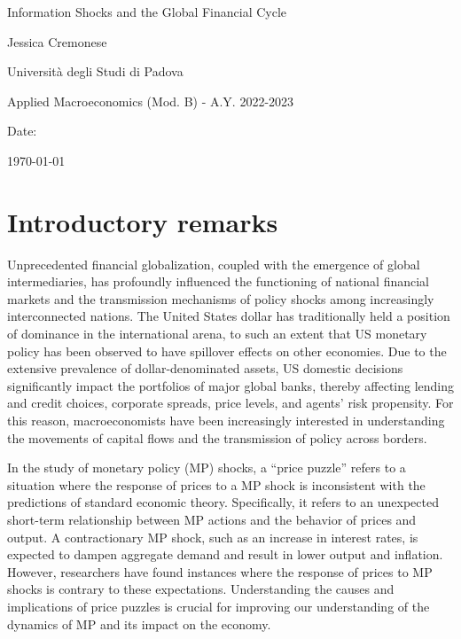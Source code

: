 \documentclass[11pt,a4paper]{article}
\begin{document}
\begin{titlepage}
    \centering
    \vspace*{2cm}
    {\LARGE Information Shocks and the Global Financial Cycle \par}
    \vspace{2cm}
    {\large Jessica Cremonese \par}
    \vspace{1cm}
    {\large Università degli Studi di Padova \par}
    \vspace{1cm}
    {\large Applied Macroeconomics (Mod. B) - A.Y. 2022-2023 \par}
    \vspace{1cm}
    {\large Date: \par}
    {\large \today \par}
\end{titlepage}


\newpage
\section{Introductory remarks}    
Unprecedented financial globalization, coupled with the emergence of global intermediaries, has profoundly influenced the functioning of national financial markets and the transmission mechanisms of policy shocks among increasingly interconnected nations.
The United States dollar has traditionally held a position of dominance in the international arena, to such an extent that US monetary policy has been observed to have spillover effects on other economies.
Due to the extensive prevalence of dollar-denominated assets, US domestic decisions significantly impact the portfolios of major global banks, thereby affecting lending and credit choices, corporate spreads, price levels, and agents' risk propensity.
For this reason, macroeconomists have been increasingly interested in understanding the movements of capital flows and the transmission of policy across borders. 

In the study of monetary policy (MP) shocks, a \enquote{price puzzle} refers to a situation where the response of prices to a MP shock is inconsistent with the predictions of standard economic theory. Specifically, it refers to an unexpected short-term relationship between MP actions and the behavior of prices and output. 
A contractionary MP shock, such as an increase in interest rates, is expected to dampen aggregate demand and result in lower output and inflation. However, researchers have found instances where the response of prices to MP shocks is contrary to these expectations. 
Understanding the causes and implications of price puzzles is crucial for improving our understanding of the dynamics of MP and its impact on the economy.
\end{document}
